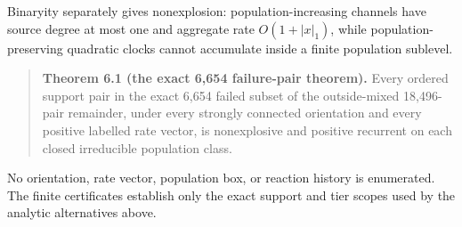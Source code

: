 Binaryity separately gives nonexplosion: population-increasing channels
have source degree at most one and aggregate rate \(O(1+|x|_1)\), while
population-preserving quadratic clocks cannot accumulate inside a finite
population sublevel.

\begin{quote}
\textbf{Theorem 6.1 (the exact 6,654 failure-pair theorem).} Every
ordered support pair in the exact 6,654 failed subset of the
outside-mixed 18,496-pair remainder, under every strongly connected
orientation and every positive labelled rate vector, is nonexplosive and
positive recurrent on each closed irreducible population class.
\end{quote}

No orientation, rate vector, population box, or reaction history is
enumerated. The finite certificates establish only the exact support and
tier scopes used by the analytic alternatives above.
